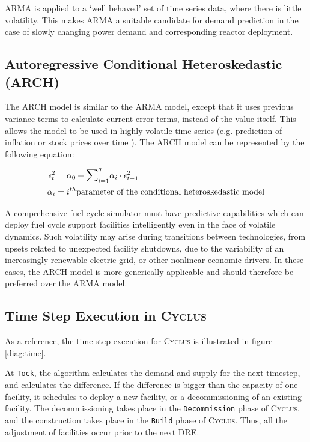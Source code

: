 \documentclass[11pt,letterpaper]{article}
\newcommand{\Cyclus}{\textsc{Cyclus}\xspace}%
\begin{document}
\gls{ARMA} is applied to a `well behaved' set of time series data,
where there is little volatility. This makes \gls{ARMA} a suitable
candidate for demand prediction in the case of slowly changing power demand and 
corresponding reactor deployment.


\subsection{Autoregressive Conditional Heteroskedastic (ARCH)}
The \gls{ARCH} model is similar to the \gls{ARMA} model, except that
it uses previous variance terms to calculate current error terms, instead
of the value itself. This allows the model to be used in highly volatile 
time series (e.g. prediction of inflation or stock prices over time 
\cite{bollerslev_generalized_1986}).
The \gls{ARCH} model can be represented by the following equation:

\begin{align}
    \epsilon_t^2 &= \alpha_0+{\mathlarger{\sum}}_{i=1}^{q}\alpha_i\cdot\epsilon_{t-1}^2\\
    \alpha_i&= i^{th} \mbox{parameter of the conditional heteroskedastic model}
\end{align}

A comprehensive fuel cycle simulator must have predictive capabilities which 
can deploy fuel cycle support facilities intelligently even in the face of 
volatile dynamics. Such volatility may arise during transitions between 
technologies, from upsets related to unexpected facility shutdowns, due to the variability 
of an increasingly renewable electric grid, or other nonlinear economic 
drivers.  In these cases, the \gls{ARCH} model is more generically applicable 
and should therefore be preferred over the \gls{ARMA} 
model.

\subsection{Time Step Execution in \Cyclus}
As a reference, the time step execution for \Cyclus is illustrated in figure \ref{diag:time}.

At \texttt{Tock}, the algorithm calculates the demand and supply for the next timestep, and calculates
the difference. If the difference is bigger than the capacity of one facility, it
schedules to deploy a new facility, or a decommissioning of an existing facility.
The decommissioning takes place in the \texttt{Decommission} phase of \Cyclus, and
the construction takes place in the \texttt{Build} phase of \Cyclus. Thus, all the
adjustment of facilities occur prior to the next \gls{DRE}.
\end{document}
